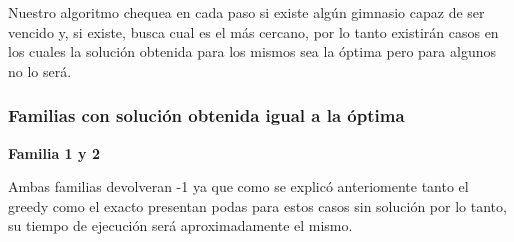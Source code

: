 Nuestro algoritmo chequea en cada paso si existe alg\'un gimnasio capaz de ser vencido y, si existe, busca cual es el m\'as cercano, por lo tanto existir\'an casos en los cuales la soluci\'on obtenida para los mismos sea la \'optima pero para algunos no lo ser\'a.

\subsubsection*{Familias con soluci\'on obtenida igual a la \'optima}


\begin{center}
\textbf{Familia 1 y 2}
\end{center}

Ambas familias devolveran -1 ya que como se explicó anteriomente tanto el greedy como el exacto presentan podas para estos casos sin soluci\'on por lo tanto, su tiempo de ejecuci\'on ser\'a aproximadamente el mismo. \\\\\\\\\\\\\\\\\\\


